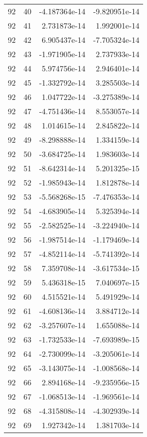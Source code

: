 \begin{tabular}{rrrr}
  92 &   40 & -4.187364e-14 & -9.820951e-14 \\
  92 &   41 &  2.731873e-14 &  1.992001e-14 \\
  92 &   42 &  6.905437e-14 & -7.705324e-14 \\
  92 &   43 & -1.971905e-14 &  2.737933e-14 \\
  92 &   44 &  5.974756e-14 &  2.946401e-14 \\
  92 &   45 & -1.332792e-14 &  3.285503e-14 \\
  92 &   46 &  1.047722e-14 & -3.275389e-14 \\
  92 &   47 & -4.751436e-14 &  8.553057e-14 \\
  92 &   48 &  1.014615e-14 &  2.845822e-14 \\
  92 &   49 & -8.298888e-14 &  1.334159e-14 \\
  92 &   50 & -3.684725e-14 &  1.983603e-14 \\
  92 &   51 & -8.642314e-14 &  5.201325e-15 \\
  92 &   52 & -1.985943e-14 &  1.812878e-14 \\
  92 &   53 & -5.568268e-15 & -7.476353e-14 \\
  92 &   54 & -4.683905e-14 &  5.325394e-14 \\
  92 &   55 & -2.582525e-14 & -3.224940e-14 \\
  92 &   56 & -1.987514e-14 & -1.179469e-14 \\
  92 &   57 & -4.852114e-14 & -5.741392e-14 \\
  92 &   58 &  7.359708e-14 & -3.617534e-15 \\
  92 &   59 &  5.436318e-15 &  7.040697e-15 \\
  92 &   60 &  4.515521e-14 &  5.491929e-14 \\
  92 &   61 & -4.608136e-14 &  3.884712e-14 \\
  92 &   62 & -3.257607e-14 &  1.655088e-14 \\
  92 &   63 & -1.732533e-14 & -7.693989e-15 \\
  92 &   64 & -2.730099e-14 & -3.205061e-14 \\
  92 &   65 & -3.143075e-14 & -1.008568e-14 \\
  92 &   66 &  2.894168e-14 & -9.235956e-15 \\
  92 &   67 & -1.068513e-14 & -1.969561e-14 \\
  92 &   68 & -4.315808e-14 & -4.302939e-14 \\
  92 &   69 &  1.927342e-14 &  1.381703e-14 \\

\end{tabular}
